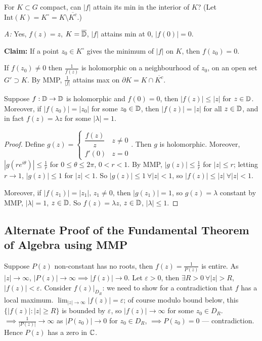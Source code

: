 \documentclass[11pt]{article}
\begin{document}
\begin{remark}[Q]
For $K\subset G$ compact, can $|f|$ attain its min in the interior of $K$? (Let $\mathrm{Int}(K)=K^\circ = K\setminus\overline{K^c}$.)

\emph{A:} Yes, $f(z)=z$, $K=\overline{{\mathbb{D}}}$, $|f|$ attains min at $0$, $|f(0)|=0$.

\textbf{Claim:} If a point $z_0\in K^\circ$ gives the minimum of $|f|$ on $K$, then $f(z_0)=0$.

If $f(z_0)\ne0$ then $\frac{1}{f(z)}$ is holomorphic on a neighbourhood of $z_0$, on an open set $G'\supset K$. By MMP, $\frac{1}{|f|}$ attains max on $\partial K = K\cap \overline{K^c}$.
\end{remark}

\begin{theorem}
Suppose $f:{\mathbb{D}}\to{\mathbb{D}}$ is holomorphic and $f(0)=0$, then $|f(z)| \le |z|$ for $z\in{\mathbb{D}}$.
Moreover, if $|f(z_0)| = |z_0|$ for some $z_0\in{\mathbb{D}}$, then $|f(z)|=|z|$ for all $z\in{\mathbb{D}}$, and in fact $f(z) = \lambda z$ for some $|\lambda|=1$.
\end{theorem}

\begin{proof}
Define $g(z) = \begin{cases} \dfrac{f(z)}{z} & z\ne0 \\ f'(0) & z=0 \end{cases}$. Then $g$ is holomorphic.
Moreover, $|g(re^{i\theta})| \le \frac1r$ for $0\le\theta\le2\pi$, $0<r<1$. By MMP, $|g(z)| \le \frac1r$ for $|z|\le r$; letting $r\to1$, $|g(z)|\le1$ for $|z|<1$.
So $|g(z)|\le1\ \forall|z|<1$, so $|f(z)|\le|z|\ \forall|z|<1$.

Moreover, if $|f(z_1)|=|z_1|$, $z_1\ne0$, then $|g(z_1)|=1$, so $g(z)=\lambda$ constant by MMP, $|\lambda|=1$, $z\in{\mathbb{D}}$. So $f(z)=\lambda z$, $z\in{\mathbb{D}}$, $|\lambda|\le1$.
\end{proof}

\subsection{Alternate Proof of the Fundamental Theorem of Algebra using MMP}

Suppose $P(z)$ non-constant has no roots, then $f(z)=\frac{1}{P(z)}$ is entire. As $|z|\to\infty$, $|P(z)|\to\infty \implies |f(z)|\to0$.
Let $\varepsilon>0$, then $\exists R>0\ \forall|z|>R$, $|f(z)|<\varepsilon$. Consider $f(z)|_{D_R}$: we need to show for a contradiction that $f$ has a local maximum.
$\lim_{|z|\to\infty} |f(z)| = \varepsilon$; of course modulo bound below, this $\{|f(z)| : |z|\ge R\}$ is bounded by $\varepsilon$, so $|f(z)|\to\infty$ for some $z_0\in D_R$.
$\implies \frac{1}{|P(z)|}\to\infty$ as $|P(z_0)|\to0$ for $z_0\in D_R$, $\implies P(z_0)=0$ --- contradiction. Hence $P(z)$ has a zero in ${\mathbb{C}}$.
\end{document}
